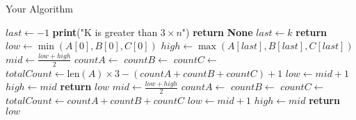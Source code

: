 \documentclass{article}
\begin{document}
\begin{algorithm}
\caption{Your Algorithm}
\begin{algorithmic}[1]
        \State $last \gets -1$
            \State \textbf{print}("K is greater than $3 \times n$")
            \State \textbf{return} \textbf{None}
        \EndIf
            \State $last \gets k$
        \EndIf
            \State \textbf{return} 
        \EndIf
        \State $low \gets \min(A[0], B[0], C[0])$
        \State $high \gets \max(A[last], B[last], C[last])$
                \State $mid \gets \frac{low + high}{2}$
                \State $countA \gets$ 
                \State $countB \gets$ 
                \State $countC \gets$ 
                \State $totalCount \gets \text{len}(A) \times 3 - (countA + countB + countC) + 1$
                    \State $low \gets mid + 1$
                \Else
                    \State $high \gets mid$
                \EndIf
            \EndWhile
            \State \textbf{return} $low$
        \EndIf
            \State $mid \gets \frac{low + high}{2}$
            \State $countA \gets$ 
            \State $countB \gets$ 
            \State $countC \gets$ 
            \State $totalCount \gets countA + countB + countC$
                \State $low \gets mid + 1$
            \Else
                \State $high \gets mid$
            \EndIf
        \EndWhile
        \State \textbf{return} $low$
    \EndFunction
\end{algorithmic}
\end{algorithm}
\end{document}
